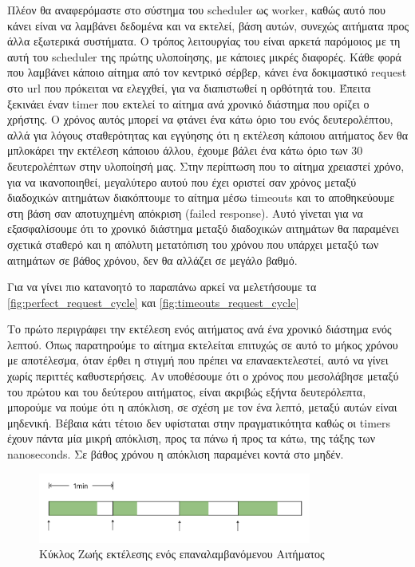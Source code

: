 Πλέον θα αναφερόμαστε στο σύστημα του scheduler ως worker, καθώς αυτό που κάνει είναι να λαμβάνει δεδομένα και να
εκτελεί, βάση αυτών, συνεχώς αιτήματα προς άλλα εξωτερικά συστήματα. Ο τρόπος λειτουργίας του είναι αρκετά παρόμοιος
με τη αυτή του scheduler της πρώτης υλοποίησης, με κάποιες μικρές διαφορές. Κάθε φορά που λαμβάνει κάποιο αίτημα από τον κεντρικό σέρβερ, κάνει ένα δοκιμαστικό request
στο url που πρόκειται να ελεγχθεί, για να διαπιστωθεί η ορθότητά του. Έπειτα ξεκινάει έναν timer που εκτελεί το αίτημα ανά
χρονικό διάστημα που ορίζει ο χρήστης. Ο χρόνος αυτός μπορεί να φτάνει ένα κάτω όριο του ενός δευτερολέπτου, αλλά για λόγους σταθερότητας και
εγγύησης ότι η εκτέλεση κάποιου αιτήματος δεν θα μπλοκάρει την εκτέλεση κάποιου άλλου, έχουμε βάλει ένα κάτω όριο των 30 δευτερολέπτων στην υλοποίησή μας.
Στην περίπτωση που το αίτημα χρειαστεί χρόνο, για να ικανοποιηθεί, μεγαλύτερο αυτού που έχει οριστεί σαν χρόνος μεταξύ
διαδοχικών αιτημάτων διακόπτουμε το αίτημα μέσω timeouts και το αποθηκεύουμε στη βάση σαν αποτυχημένη απόκριση (failed response).
Αυτό γίνεται για να εξασφαλίσουμε ότι το χρονικό διάστημα μεταξύ διαδοχικών αιτημάτων θα παραμένει
σχετικά σταθερό και η απόλυτη μετατόπιση του χρόνου που υπάρχει μεταξύ των αιτημάτων σε βάθος χρόνου,
δεν θα αλλάζει σε μεγάλο βαθμό.

Για να γίνει πιο κατανοητό το παραπάνω αρκεί να μελετήσουμε τα \autoref{fig:perfect_request_cycle} και \autoref{fig:timeouts_request_cycle}

Το πρώτο περιγράφει την εκτέλεση ενός αιτήματος ανά ένα χρονικό διάστημα ενός λεπτού. Όπως παρατηρούμε το
αίτημα εκτελείται επιτυχώς σε αυτό το μήκος χρόνου με αποτέλεσμα, όταν έρθει η στιγμή που πρέπει να επαναεκτελεστεί,
αυτό να γίνει χωρίς περιττές καθυστερήσεις. Αν υποθέσουμε ότι ο χρόνος που μεσολάβησε μεταξύ του πρώτου και του δεύτερου αιτήματος,
είναι ακριβώς εξήντα δευτερόλεπτα, μπορούμε να πούμε ότι η απόκλιση, σε σχέση με τον ένα λεπτό, μεταξύ αυτών είναι μηδενική.
Βέβαια κάτι τέτοιο δεν υφίσταται στην πραγματικότητα καθώς οι timers έχουν πάντα μία μικρή απόκλιση, προς τα πάνω ή προς τα κάτω, της τάξης των nanoseconds.
Σε βάθος χρόνου η απόκλιση παραμένει κοντά στο μηδέν.

\begin{figure}[!ht]
	\centering
	\includegraphics[width=0.8\textwidth]{./images/chapter4/perfect_request_cycle.png}
	\caption[Κύκλος Ζωής εκτέλεσης ενός επαναλαμβανόμενου Αιτήματος]{Κύκλος Ζωής εκτέλεσης ενός επαναλαμβανόμενου Αιτήματος}
	\label{fig:perfect_request_cycle}
\end{figure}

